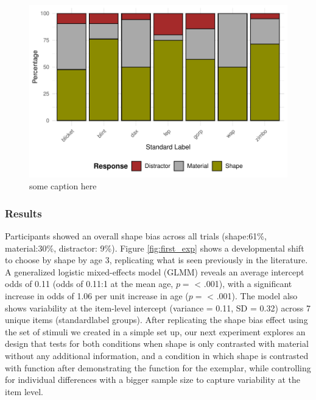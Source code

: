 \documentclass[10pt, letterpaper]{article}
\newenvironment{CodeChunk}{}{}
\begin{document}
\begin{CodeChunk}
\begin{figure}[tb]
\includegraphics[width=1\linewidth]{figs/first_exp_stim-1} \caption[some caption here]{some caption here}\label{fig:first_exp_stim}
\end{figure}
\end{CodeChunk}

\hypertarget{results}{%
\subsubsection{Results}\label{results}}

Participants showed an overall shape bias across all trials (shape:61\%,
material:30\%, distractor: 9\%). Figure \ref{fig:first_exp} shows a
developmental shift to choose by shape by age 3, replicating what is
seen previously in the literature.\\
A generalized logistic mixed-effects model (GLMM) reveals an average
intercept odds of 0.11 (odds of 0.11:1 at the mean age, \(p=\)
\textless{} .001), with a significant increase in odds of 1.06 per unit
increase in age (\(p=\) \textless{} .001). The model also shows
variability at the item-level intercept (variance = 0.11, SD = 0.32)
across 7 unique items (standardlabel groups). After replicating the
shape bias effect using the set of stimuli we created in a simple set
up, our next experiment explores an design that tests for both
conditions when shape is only contrasted with material without any
additional information, and a condition in which shape is contrasted
with function after demonstrating the function for the exemplar, while
controlling for individual differences with a bigger sample size to
capture variability at the item level.
\end{document}
